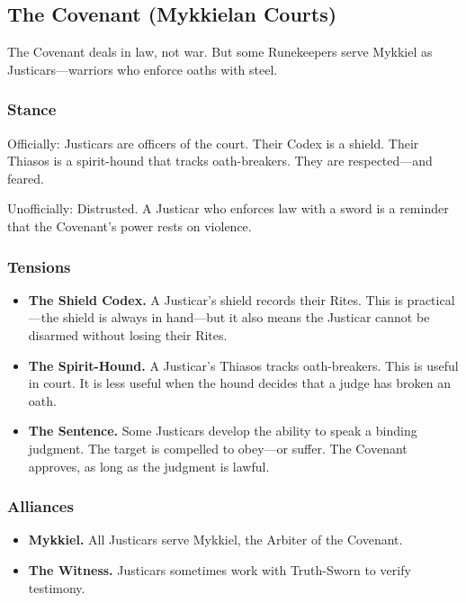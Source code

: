\subsection{The Covenant (Mykkielan Courts)}

The Covenant deals in law, not war. But some Runekeepers serve Mykkiel as Justicars—warriors who enforce oaths with steel.

\subsubsection{Stance}

Officially: Justicars are officers of the court. Their Codex is a shield. Their Thiasos is a spirit-hound that tracks oath-breakers. They are respected—and feared.

Unofficially: Distrusted. A Justicar who enforces law with a sword is a reminder that the Covenant's power rests on violence.

\subsubsection{Tensions}

\begin{itemize}
\item \textbf{The Shield Codex.} A Justicar's shield records their Rites. This is practical—the shield is always in hand—but it also means the Justicar cannot be disarmed without losing their Rites.
\item \textbf{The Spirit-Hound.} A Justicar's Thiasos tracks oath-breakers. This is useful in court. It is less useful when the hound decides that a judge has broken an oath.
\item \textbf{The Sentence.} Some Justicars develop the ability to speak a binding judgment. The target is compelled to obey—or suffer. The Covenant approves, as long as the judgment is lawful.
\end{itemize}

\subsubsection{Alliances}

\begin{itemize}
\item \textbf{Mykkiel.} All Justicars serve Mykkiel, the Arbiter of the Covenant.
\item \textbf{The Witness.} Justicars sometimes work with Truth-Sworn to verify testimony.
\end{itemize}

